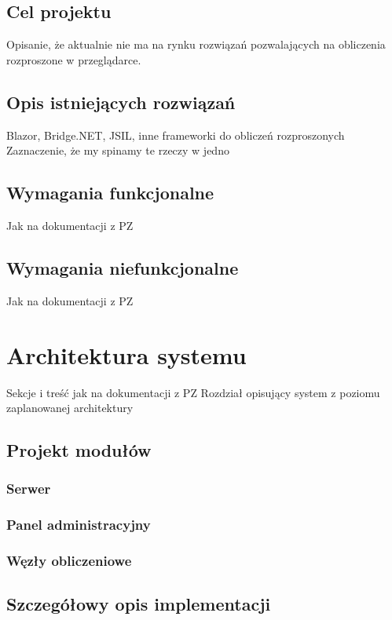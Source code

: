 \documentclass[a4paper,11pt,twoside]{report}
\theoremstyle{definition}
\begin{document}
    \section{Cel projektu}
        Opisanie, że aktualnie nie ma na rynku rozwiązań pozwalających na obliczenia rozproszone w przeglądarce.
    
    \section{Opis istniejących rozwiązań}
        Blazor, Bridge.NET, JSIL, inne frameworki do obliczeń rozproszonych
        Zaznaczenie, że my spinamy te rzeczy w jedno
        
    \section{Wymagania funkcjonalne}
        Jak na dokumentacji z PZ
        
    \section{Wymagania niefunkcjonalne}
        Jak na dokumentacji z PZ
    
\chapter{Architektura systemu}
    Sekcje i treść jak na dokumentacji z PZ
    Rozdział opisujący system z poziomu zaplanowanej architektury

    \section{Projekt modułów}
        \subsection{Serwer}
        \subsection{Panel administracyjny}
        \subsection{Węzły obliczeniowe}
    
    \section{Szczegółowy opis implementacji}
\end{document}
